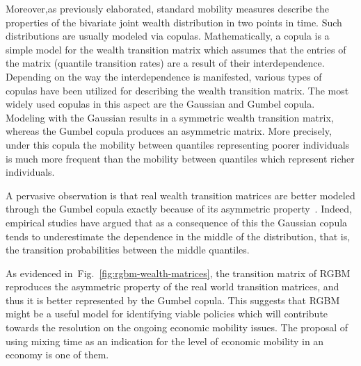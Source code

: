 \documentclass[11pt]{article}
\newcommand{\fref}[1]{Fig.~\ref{fig:#1}}
\numberwithin{equation}{section}
\begin{document}
Moreover,as previously elaborated, standard mobility measures describe the properties of the bivariate joint wealth distribution in two points in time. Such distributions are usually modeled via copulas. Mathematically, a copula is a simple model for the wealth transition matrix which assumes that the entries of the matrix (quantile transition rates) are a result of their interdependence. Depending on the way the interdependence is manifested, various types of copulas have been utilized for describing the wealth transition matrix. The most widely used copulas in this aspect are the Gaussian and Gumbel copula. Modeling with the Gaussian results in a symmetric wealth transition matrix, whereas the Gumbel copula produces an asymmetric matrix. More precisely, under this copula the mobility between quantiles representing poorer individuals is much more frequent than the mobility between quantiles which represent richer individuals.

A pervasive observation is that real wealth transition matrices are better modeled through the Gumbel copula exactly because of its asymmetric property~\cite{jantti2015income}. Indeed, empirical studies have argued that as a consequence of this the Gaussian copula
tends to underestimate the dependence in the middle of the distribution, that is, the transition probabilities between the middle quantiles. 

As evidenced in~\fref{rgbm-wealth-matrices}, the transition matrix of RGBM reproduces the asymmetric property of the real world transition matrices, and thus it is better represented by the Gumbel copula. This suggests that RGBM might be a useful model for identifying viable policies which will contribute towards the resolution on the ongoing economic mobility issues. The proposal of using mixing time as an indication for the level of economic mobility in an economy is one of them.
\end{document}
